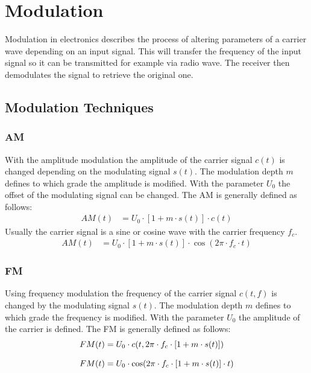 \section{Modulation}\label{sec:theory:mod}

%
Modulation in electronics describes the process of altering parameters of a carrier wave depending on an input signal. This will transfer the frequency of the input signal so it can be transmitted for example via radio wave. The receiver then demodulates the signal to retrieve the original one.\cite{netzberger_kommunikationstechnologie_2021-1}

\subsection{Modulation Techniques}

\subsubsection*{AM}
With the amplitude modulation the amplitude of the carrier signal $c(t)$ is changed depending on the modulating signal $s(t)$. The modulation depth $m$ defines to which grade the amplitude is modified. With the parameter $U_0$ the offset of the modulating signal can be changed.\p
The AM is generally defined as follows:\cite{netzberger_kommunikationstechnologie_2021-1}
%
\begin{align}
  AM(t) &= U_0 \cdot [1 + m \cdot s(t)] \cdot c(t)
\end{align}
%
Usually the carrier signal is a sine or cosine wave with the carrier frequency $f_c$.
%
\begin{align}
  AM(t) &= U_0 \cdot [1 + m \cdot s(t)] \cdot \cos (2 \pi \cdot f_c \cdot t)\label{eq:theory:mod:am}
\end{align}
%
\subsubsection*{FM}
%
Using frequency modulation the frequency of the carrier signal $c(t, f)$ is changed by the modulating signal $s(t)$. The modulation depth $m$ defines to which grade the frequency is modified. With the parameter $U_0$ the amplitude of the carrier is defined.\p
The FM is generally defined as follows:\cite{netzberger_kommunikationstechnologie_2021-1}
%
\begin{align}
  FM(t) &= U_0 \cdot c(t, 2 \pi \cdot f_c \cdot [1 + m \cdot s(t)])\pmath
  FM(t) &= U_0 \cdot \cos (2 \pi \cdot f_c \cdot [1 + m \cdot s(t)] \cdot t) \label{eq:theory:mod:fm}
\end{align}

